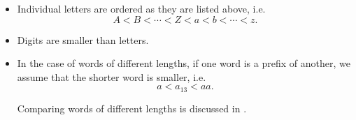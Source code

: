 \begin{remark}
\begin{itemize}
    \item Individual letters are ordered as they are listed above, i.e.
    \begin{equation*}
      A < B < \cdots < Z < a < b < \cdots < z.
    \end{equation*}

    \item Digits are smaller than letters.

    \item In the case of words of different lengths, if one word is a prefix of another, we assume that the shorter word is smaller, i.e.
    \begin{equation*}
      a < a_{13} < aa.
    \end{equation*}

    Comparing words of different lengths is discussed in .
  \end{itemize}
\end{remark}

